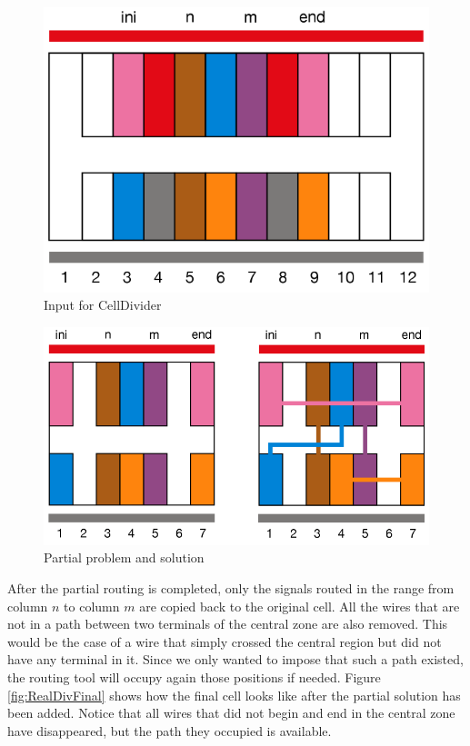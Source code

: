 \vspace{10 mm}
\begin{figure}[h!]
  \centering
  \includegraphics[scale=0.5]{img/design/RealDivBuida.png}
  \caption{Input for CellDivider}
  \label{fig:RealDivBuida}
\end{figure} 

\begin{figure}[h!]
  \centering
  \includegraphics[scale=0.5]{img/design/RealDivMitja.png}
  \caption{Partial problem and solution}
  \label{fig:RealDivParcial}
\end{figure} 


After the partial routing is completed, only the signals routed in the range from column $n$ to column $m$ are copied back to the original cell. All the wires that are not in a path between two terminals of the central zone are also removed. This would be the case of a wire that simply crossed the central region but did not have any terminal in it. Since we only wanted to impose that such a path existed, the routing tool will occupy again those positions if needed. Figure \ref{fig:RealDivFinal} shows how the final cell looks like after the partial solution has been added. Notice that all wires that did not begin and end in the central zone have disappeared, but the path they occupied is available. \\


